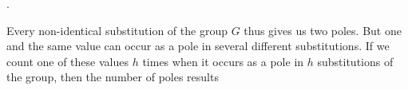 \par{}.\ 

Every non-identical substitution of the group $G$ thus gives us
two poles. But one and the same value can occur as a pole
in several different substitutions. If we count
one of these values $h$ times when it occurs as a pole in $h$ substitutions of the
group, then the number of poles results
